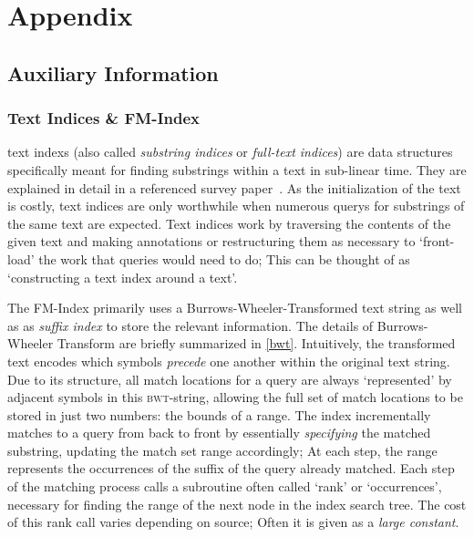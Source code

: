 \appendix
\chapter{Appendix}
 \label{appendix}
\section{Auxiliary Information}
 \label{aux_info}

\subsection{Text Indices \& FM-Index}
\label{fmindex}

\Glspl{text index} (also called \textit{substring indices} or \textit{full-text indices}) are data structures specifically meant for finding substrings within a \gls{text} in sub-linear time. They are explained in detail in a referenced survey paper~\cite{fmfordummies}. As the initialization of the text is costly, text indices are only worthwhile when numerous \glspl{query} for substrings of the same text are expected. Text indices work by traversing the contents of the given text and making annotations or restructuring them as necessary to `front-load' the work that queries would need to do; This can be thought of as `constructing a text index around a text'.
 
The FM-Index primarily uses a Burrows-Wheeler-Transformed text string as well as as \textit{suffix index} to store the relevant information. The details of Burrows-Wheeler Transform are briefly summarized in \ref{bwt}. Intuitively, the transformed text encodes which symbols \textit{precede} one another within the original text string. Due to its structure, all \glspl{match location} for a query are always `represented' by adjacent symbols in this \textsc{bwt}-string, allowing the full set of match locations to be stored in just two numbers: the bounds of a range. The index incrementally matches to a \gls{query} from back to front by essentially \textit{specifying} the matched substring, updating the match set range accordingly; At each step, the range represents the occurrences of the suffix of the query already matched. Each step of the matching process calls a subroutine often called `rank' or `occurrences', necessary for finding the range of the next node in the index search tree. The cost of this rank call varies depending on source; Often it is given as a \textit{large constant}.
 
